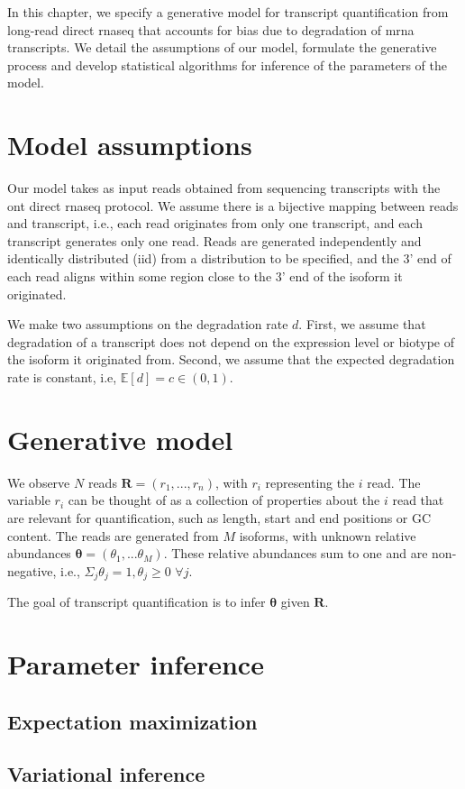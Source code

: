 
In this chapter, we specify a generative model for transcript quantification from long-read direct \gls{rnaseq} that accounts for bias due to degradation of \gls{mrna} transcripts. We detail the assumptions of our model, formulate the generative process and develop statistical algorithms for inference of the parameters of the model.  

\section{Model assumptions}

Our model takes as input reads obtained from sequencing transcripts with the \gls{ont} direct \gls{rnaseq} protocol. We assume there is a bijective mapping between reads and transcript, i.e., each read originates from only one transcript, and each transcript generates only one read. Reads are generated independently and identically distributed (iid) from a distribution to be specified, and the 3' end of each read aligns within some region close to the 3' end of the isoform it originated.

We make two assumptions on the degradation rate $d$. First, we assume that degradation of a transcript does not depend on the expression level or biotype of the isoform it originated from. Second, we assume that the expected degradation rate is constant, i.e, $\mathbb{E}[d]=c\in(0,1)$. 

\section{Generative model}

We observe $N$ reads $\bm{R}=(r_1,...,r_n)$, with $r_i$ representing the $i$ read. The variable $r_i$ can be thought of as a collection of properties about the $i$ read that are relevant for quantification, such as length, start and end positions or GC content. The reads are generated from $M$ isoforms, with unknown relative abundances $\bm{\theta}=(\theta_1,...\theta_M)$. These relative abundances sum to one and are non-negative, i.e., $\Sigma_j\theta_j=1, \theta_j\geq0$ $\forall j$. 

The goal of transcript quantification is to infer $\bm{\theta}$ given $\bm{R}$.

\section{Parameter inference}

\subsection{Expectation maximization}

\subsection{Variational inference}


